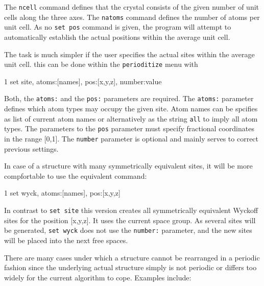 The {\tt ncell} command defines that the crystal consists of the given 
number of unit cells along the three axes. The {\tt natoms} command defines the
number of atoms per unit cell. As no {\tt set pos} command is given, 
the program will attempt to automatically establish the actual positions 
within the average unit cell. 

The task is much simpler if the user specifies the actual sites within the 
average unit cell. this can be done within the {\tt perioditize} menu
with 
\begin{MacVerbatim}
1  set site, atoms:[names], pos:[x,y,z], number:value
\end{MacVerbatim}
Both, the {\tt atoms:} and the {\tt pos:} parameters are required. The
{\tt atoms:} parameter defines which atom types may occupy the given site. 
Atom names can be spcifies as list of current atom names or alternatively 
as the string {\tt all} to imply all atom types. The parameters to the 
{\tt pos} parameter must specify fractional coordinates in the range [0,1].
The {\tt number} parameter is optional and mainly serves to correct 
previous settings.

In case of a structure with many symmetrically equivalent sites, it will
be more compfortable to use the equivalent command:
\begin{MacVerbatim}
1  set wyck, atoms:[names], pos:[x,y,z]
\end{MacVerbatim}
In contrast to {\tt set site} this version creates all symmetrically 
equivalent Wyckoff sites for the position [x,y,z]. It uses the current 
space group. As several sites will be generated, {\tt set wyck} does not
use the {\tt number:} parameter, and the new sites will be placed into
the next free spaces. 

There are many cases under which a structure cannot be rearranged in a
periodic fashion since the underlying actual structure simply is not
periodic or differs too widely for the current algorithm to cope. 
Examples include:

